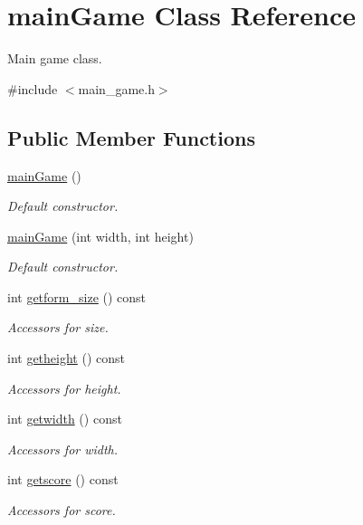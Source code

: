 \hypertarget{classmain_game}{}\section{main\+Game Class Reference}
\label{classmain_game}


Main game class.  




{\ttfamily \#include $<$main\+\_\+game.\+h$>$}

\subsection*{Public Member Functions}
\begin{DoxyCompactItemize}
\item 
\hyperlink{classmain_game_ac016bd8f9474e58c5168b4c248877391}{main\+Game} ()
\begin{DoxyCompactList}\small\item\em Default constructor. \end{DoxyCompactList}\item 
\hyperlink{classmain_game_a1a42050393a3a0f9aabfc898709b5438}{main\+Game} (int width, int height)
\begin{DoxyCompactList}\small\item\em Default constructor. \end{DoxyCompactList}\item 
int \hyperlink{classmain_game_aa756b9ac462f108586efc8b846cc577c}{getform\+\_\+size} () const
\begin{DoxyCompactList}\small\item\em Accessors for size. \end{DoxyCompactList}\item 
int \hyperlink{classmain_game_ae346d0d0edeabaaf2fab2dd1049bbc86}{getheight} () const
\begin{DoxyCompactList}\small\item\em Accessors for height. \end{DoxyCompactList}\item 
int \hyperlink{classmain_game_a3958ae533f81f1c40bd5e51589927777}{getwidth} () const
\begin{DoxyCompactList}\small\item\em Accessors for width. \end{DoxyCompactList}\item 
int \hyperlink{classmain_game_a6f819a6a3433816a8f30a0e540f985a7}{getscore} () const
\begin{DoxyCompactList}\small\item\em Accessors for score. \end{DoxyCompactList}\item 

\end{DoxyCompactItemize}
